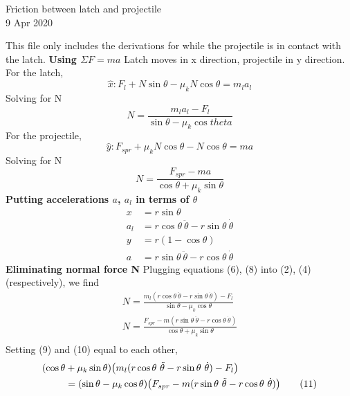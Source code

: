 \documentclass[12pt]{article}
\begin{document}
\begin{center}
    Friction between latch and projectile \\
    9 Apr 2020
\end{center}


\noindent This file only includes the derivations for while the projectile is in contact with the latch.
\newline
\noindent \textbf{Using $\Sigma F = ma$}
\newline
Latch moves in x direction, projectile in y direction.
\newline
For the latch,
\[ \tag{1}
    \hat{x}: F_l + N \sin{\theta} - \mu_k N \cos{\theta} = m_l a_l
\]
Solving for N
\[\tag{2}
    N = \frac{m_l a_l - F_l}{\sin{\theta} - \mu_k \cos{theta}}
\]
\newline
For the projectile,
\[\tag{3}
    \hat{y}: F_{spr} + \mu_k N \cos{\theta} - N \cos{\theta} = m a
\]
Solving for N
\[\tag{4}
    N = \frac{F_{spr} - ma}{\cos{\theta} + \mu_k \sin{\theta}}
\]
\newline
\noindent \textbf{Putting accelerations $a$, $a_l$ in terms of $\theta$}
\newline
\begin{align}
    x & = r \sin{\theta} \tag{5} \\
    a_l & = r \cos{\theta} \  \ddot{\theta} - r \sin{\theta} \  \dot{\theta} \tag{6} \\
    y & = r (1 - \cos{\theta}) \tag{7} \\
    a & = r \sin{\theta} \  \ddot{\theta} - r \cos{\theta} \  \dot{\theta} \tag{8}
\end{align}
\newline
\noindent \textbf{Eliminating normal force N}
\newline
Plugging equations (6), (8) into (2), (4) (respectively), we find
\begin{align}
    N = \frac{m_l (r \cos{\theta} \  \ddot{\theta} - r \sin{\theta} \  \dot{\theta}) - F_l}{\sin{\theta} - \mu_k \cos{\theta}} \tag{9} \\
    N = \frac{F_{spr} - m (r \sin{\theta} \  \ddot{\theta} - r \cos{\theta} \  \dot{\theta})}{\cos{\theta} + \mu_k \sin{\theta}} \tag{10} \\
\end{align}
\newline
Setting (9) and (10) equal to each other,
\begin{align}
    (\cos{\theta} & + \mu_k \sin{\theta}) \bigl( m_l (r \cos{\theta} \  \ddot{\theta} - r \sin{\theta} \  \dot{\theta}) - F_l \bigr) \notag \\
    & = (\sin{\theta} - \mu_k \cos{\theta}) \bigl(F_{spr} - m (r \sin{\theta} \  \ddot{\theta} - r \cos{\theta} \  \dot{\theta}) \bigr) \tag{11}
\end{align}
\end{document}
